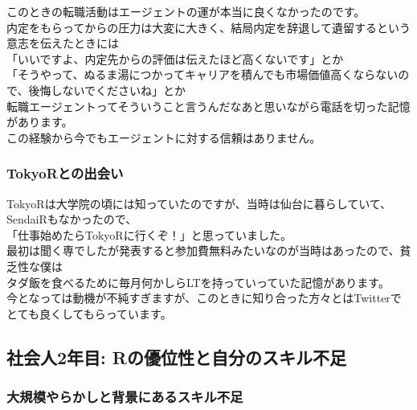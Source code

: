 \documentclass[
  letterpaper,
  DIV=11,
  numbers=noendperiod]{scrartcl}
\begin{document}
このときの転職活動はエージェントの運が本当に良くなかったのです。\\
内定をもらってからの圧力は大変に大きく、結局内定を辞退して遺留するという意志を伝えたときには\\
「いいですよ、内定先からの評価は伝えたほど高くないです」とか\\
「そうやって、ぬるま湯につかってキャリアを積んでも市場価値高くならないので、後悔しないでくださいね」とか\\
転職エージェントってそういうこと言うんだなあと思いながら電話を切った記憶があります。\\
この経験から今でもエージェントに対する信頼はありません。

\hypertarget{tokyorux3068ux306eux51faux4f1aux3044}{%
\subsubsection{TokyoRとの出会い}\label{tokyorux3068ux306eux51faux4f1aux3044}}

TokyoRは大学院の頃には知っていたのですが、当時は仙台に暮らしていて、SendaiRもなかったので、\\
「仕事始めたらTokyoRに行くぞ！」と思っていました。\\
最初は聞く専でしたが発表すると参加費無料みたいなのが当時はあったので、貧乏性な僕は\\
タダ飯を食べるために毎月何かしらLTを持っていっていた記憶があります。\\
今となっては動機が不純すぎますが、このときに知り合った方々とはTwitterでとても良くしてもらっています。

\hypertarget{ux793eux4f1aux4eba2ux5e74ux76ee-rux306eux512aux4f4dux6027ux3068ux81eaux5206ux306eux30b9ux30adux30ebux4e0dux8db3}{%
\subsection{社会人2年目:
Rの優位性と自分のスキル不足}\label{ux793eux4f1aux4eba2ux5e74ux76ee-rux306eux512aux4f4dux6027ux3068ux81eaux5206ux306eux30b9ux30adux30ebux4e0dux8db3}}

\hypertarget{ux5927ux898fux6a21ux3084ux3089ux304bux3057ux3068ux80ccux666fux306bux3042ux308bux30b9ux30adux30ebux4e0dux8db3}{%
\subsubsection{大規模やらかしと背景にあるスキル不足}\label{ux5927ux898fux6a21ux3084ux3089ux304bux3057ux3068ux80ccux666fux306bux3042ux308bux30b9ux30adux30ebux4e0dux8db3}}
\end{document}
